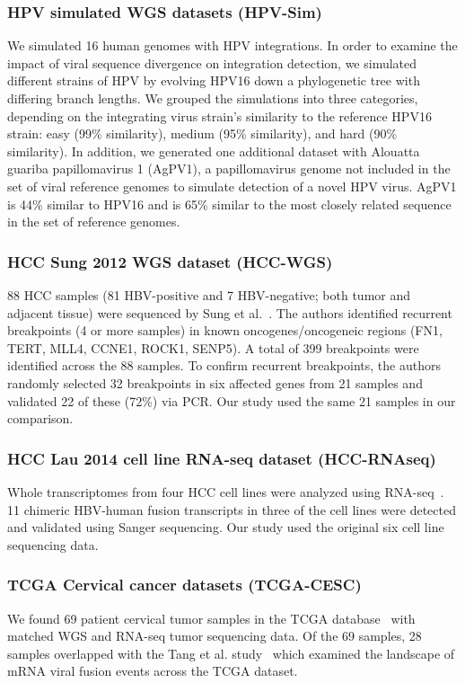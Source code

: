\documentclass{bioinfo}
\begin{document}
\subsubsection{HPV simulated WGS datasets (HPV-Sim)}
We simulated 16 human genomes with HPV integrations.  In order to examine the impact of viral sequence divergence on integration detection, we simulated different strains of HPV by evolving HPV16 down a phylogenetic tree with differing branch lengths.  We grouped the simulations into three categories, depending on the integrating virus strain's similarity to the reference HPV16 strain: easy (99\% similarity), medium (95\% similarity), and hard (90\% similarity).  In addition, we generated one additional dataset with Alouatta guariba papillomavirus 1 (AgPV1), a papillomavirus genome not included in the set of viral reference genomes to simulate detection of a novel HPV virus.  AgPV1 is 44\% similar to HPV16 and is 65\% similar to the most closely related sequence in the set of reference genomes.


\subsubsection{HCC Sung 2012 WGS dataset (HCC-WGS)}
88 HCC samples (81 HBV-positive and 7 HBV-negative; both tumor and adjacent tissue) were sequenced by Sung et al.~\cite{Sung2012}.  The authors identified recurrent breakpoints (4 or more samples) in known oncogenes/oncogeneic regions (FN1, TERT, MLL4, CCNE1, ROCK1, SENP5).  A total of 399 breakpoints were identified across the 88 samples.  To confirm recurrent breakpoints, the authors randomly selected 32 breakpoints in six affected genes from 21 samples and validated 22 of these (72\%) via PCR.  Our study used the same 21 samples in our comparison.

\subsubsection{HCC Lau 2014 cell line RNA-seq dataset (HCC-RNAseq)}
Whole transcriptomes from four HCC cell lines were analyzed using RNA-seq~\cite{Lau2014}.  11 chimeric HBV-human fusion transcripts in three of the cell lines were detected and validated using Sanger sequencing.  Our study used the original six cell line sequencing data.  

\subsubsection{TCGA Cervical cancer datasets (TCGA-CESC)}
We found 69  patient cervical tumor samples in the TCGA database~\cite{TODO} with matched WGS and RNA-seq tumor sequencing data.  Of the 69 samples, 28 samples overlapped with the Tang et al. study~\cite{Tang2013} which examined the landscape of mRNA viral fusion events across the TCGA dataset.  
\end{document}
